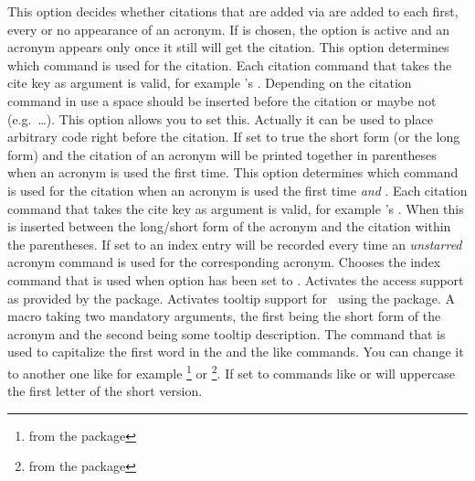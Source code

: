 \documentclass{acro-manual}
\begin{document}
\begin{options}
    This option decides whether citations that are added
    via  are added to each first, every or no appearance of an
    acronym.  If  is chosen, the option  is
    active and an acronym appears only once it still will get the citation.
    This option determines which command is used for the citation.  Each
    citation command that takes the cite key as argument is valid, for example
    's .
    Depending on the citation command in use a space should be inserted before
    the citation or maybe not (e.g.\ \ldots).  This option
    allows you to set this.  Actually it can be used to place arbitrary code
    right before the citation.
    If set to true the short form (or the long form) and the
    citation of an acronym will be printed together in parentheses when an
    acronym is used the first time.
    This option determines which command is used for the
    citation when an acronym is used the first time \emph{and}
    .  Each citation command that takes the cite
    key as argument is valid, for example 's .
    When  this is inserted
    between the long/short form of the acronym and the citation within the
    parentheses.
    If set to  an index entry will be recorded every time an
    \emph{unstarred} acronym command is used for the corresponding acronym.
    Chooses the index command that is used when option  has been
    set to .
    Activates the access support as provided by the  package.
    Activates tooltip support for \acro\ using the
     package.
    A macro taking two mandatory arguments, the first being
    the short form of the acronym and the second being some tooltip
    description.
    The command that is used to capitalize the first word in the  and
    the like commands.  You can change it to another one like for example
    \footnote{from the  package} or
    \footnote{from the  package}.
    If set to  commands like  or 
    will uppercase the first letter of the short version.
\end{options}
\end{document}
